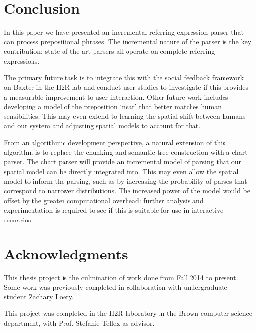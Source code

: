 \documentclass[conference]{IEEEtran}
\numberwithin{equation}{section}
\begin{document}
\section{Conclusion}
In this paper we have presented an incremental referring expression parser that can process prepositional phrases. The incremental nature of the parser is the key contribution: state-of-the-art parsers all operate on complete referring expressions. 

The primary future task is to integrate this with the social feedback framework on Baxter in the H2R lab and conduct user studies to investigate if this provides a measurable improvement to user interaction. Other future work includes developing a model of the preposition `near' that better matches human sensibilities. This may even extend to learning the spatial shift between humans and our system and adjusting spatial models to account for that.

From an algorithmic development perspective, a natural extension of this algorithm is to replace the chunking and semantic tree construction with a chart parser. The chart parser will provide an incremental model of parsing that our spatial model can be directly integrated into. This may even allow the spatial model to inform the parsing, such as by increasing the probability of parses that correspond to narrower distributions. The increased power of the model would be offset by the greater computational overhead: further analysis and experimentation is required to see if this is suitable for use in interactive scenarios.

\section{Acknowledgments}
This thesis project is the culmination of work done from Fall 2014 to present. Some work was previously completed in collaboration with undergraduate student Zachary Loery.

This project was completed in the H2R laboratory in the Brown computer science department, with Prof. Stefanie Tellex as advisor.

\vfill\break

\printbibliography
\end{document}

